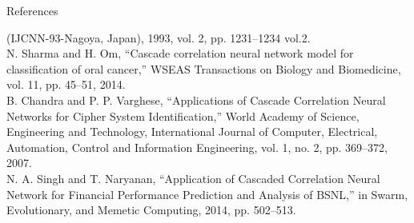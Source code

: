\documentclass[presentation]{beamer}
\begin{document}
\begin{frame}[allowframebreaks, t]{References}
\begin{thebibliography}{99}
    (IJCNN-93-Nagoya, Japan), 1993, vol. 2, pp. 1231–1234 vol.2. \\
    \bibitem{} N. Sharma and H. Om, “Cascade correlation neural network model for
    classification of oral cancer,” WSEAS Transactions on Biology and
    Biomedicine, vol. 11, pp. 45–51, 2014. \\
    \bibitem{} B. Chandra and P. P. Varghese, “Applications of Cascade Correlation
    Neural Networks for Cipher System Identification,” World Academy of Science,
    Engineering and Technology, International Journal of Computer, Electrical,
    Automation, Control and Information Engineering, vol. 1, no. 2, pp. 369–372,
    2007. \\
    \bibitem{} N. A. Singh and T. Naryanan, “Application of Cascaded Correlation Neural
    Network for Financial Performance Prediction and Analysis of BSNL,” in
    Swarm, Evolutionary, and Memetic Computing, 2014, pp. 502–513. \\

    \end{thebibliography}
  \end{frame}
\end{document}
